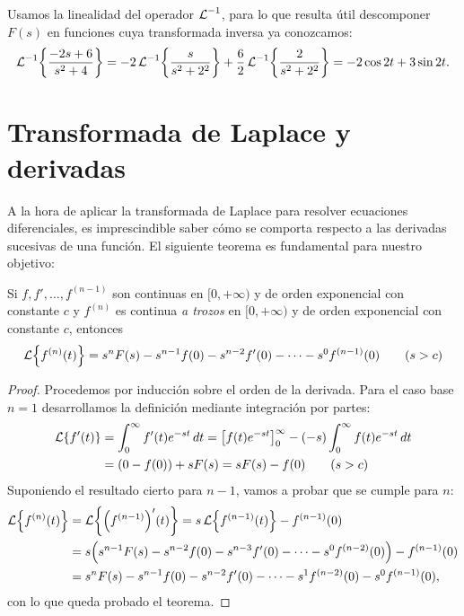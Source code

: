 \documentclass[../ecuaciones_diferenciales.tex]{subfiles}
\begin{document}
\begin{solution}
	Usamos la linealidad del operador \(\operatorname{\mathcal{L}}^{-1}\), para lo que resulta útil
	descomponer \(F(s)\) en funciones cuya transformada inversa ya conozcamos:
	\[\laplace^{-1}\left\{\frac{-2s+6}{s^2+4}\right\} =
		-2\laplace^{-1}\left\{\frac{s}{s^2+2^2}\right\} +
		\frac{6}{2}\laplace^{-1}\left\{\frac{2}{s^2+2^2}\right\} = -2 \cos 2t + 3 \sin 2t.\]
\end{solution}

\section{Transformada de Laplace y derivadas}
A la hora de aplicar la transformada de Laplace para resolver ecuaciones
diferenciales, es imprescindible saber cómo se comporta respecto a las derivadas
sucesivas de una función. El siguiente teorema es fundamental para nuestro
objetivo:

\begin{theorem}
	Si \(f, f', \dots, f^{(n-1)}\) son continuas en \([0,+\infty)\) y de orden
	exponencial con constante \(c\) y \(f^{(n)}\) es continua \emph{a trozos} en
	\([0,+\infty)\) y de orden exponencial con constante \(c\), entonces
	\[\laplace\left\{f^{(n)}(t)\right\} = s^nF(s) - s^{n-1}f(0) - s^{n-2}f'(0) - \cdots -
		s^0f^{(n-1)}(0) \qquad (s>c)\]
	\begin{proof}
		Procedemos por inducción sobre el orden de la derivada. Para el caso base
		\(n=1\) desarrollamos la definición mediante integración por partes:
		\begin{align*}
			\laplace\{f'(t)\} & = \int_0^\infty f'(t)e^{-st} \dif t =
			\left[f(t)e^{-st}\right]_0^\infty - (-s) \int_0^\infty f(t)e^{-st} \dif t \\
			            & = (0-f(0)) + sF(s) = sF(s) - f(0) \qquad (s > c)
		\end{align*}
		Suponiendo el resultado cierto para \(n-1\), vamos a probar que se cumple
		para \(n\):
		\begin{align*}
			\laplace\left\{f^{(n)}(t)\right\}
			 & = \laplace\left\{\left(f^{(n-1)}\right)'(t)\right\}
			= s\laplace\left\{f^{(n-1)}(t)\right\} - f^{(n-1)}(0)        \\
			 & = s \left( s^{n-1}F(s) - s^{n-2}f(0) - s^{n-3}f'(0)
			- \cdots - s^0f^{(n-2)}(0) \right) - f^{(n-1)}(0)      \\
			 & = s^nF(s) - s^{n-1}f(0) - s^{n-2}f'(0) - \cdots
			- s^1f^{(n-2)}(0) - s^0f^{(n-1)}(0),
		\end{align*}
		con lo que queda probado el teorema.
	\end{proof}
\end{theorem}
\end{document}
